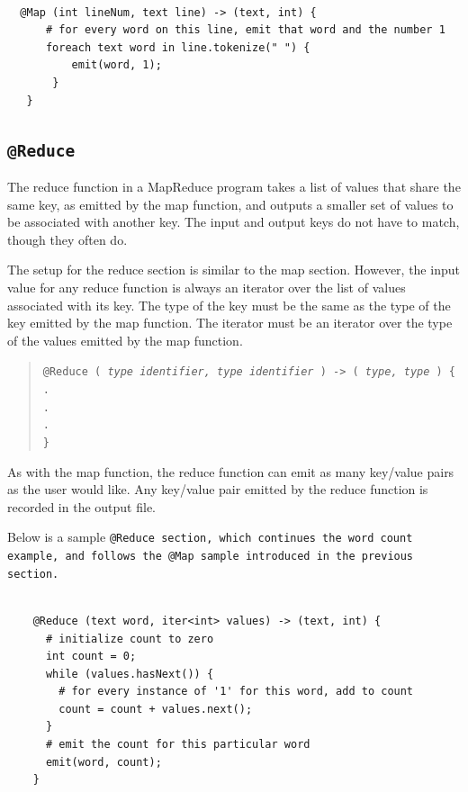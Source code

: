 \documentclass{book}
\begin{document}
\begin{verbatim}

  @Map (int lineNum, text line) -> (text, int) {
      # for every word on this line, emit that word and the number 1
      foreach text word in line.tokenize(" ") {
          emit(word, 1);
       }
   }

\end{verbatim}



\subsection{\tt @Reduce \rm} %
\label{sub:tt_reduce_rm}

The reduce function in a MapReduce program takes a list of values that share the
same key, as emitted by the map function, and outputs a smaller set of values to
be associated with another key. The input and output keys do not have to match,
though they often do.

The setup for the reduce section is similar to the map section. However, the input
value for any reduce function is always an iterator over the list of values
associated with its key. The type of the key must be the same as the type of the
key emitted by the map function. The iterator must be an iterator over the type of
the values emitted by the map function.

\begin{quotation}
  \tt @Reduce ( \rm \emph{type identifier, type identifier} \tt ) -> ( \rm \emph{type, type} \tt ) \{ \\
  \indent \indent . \\
  \indent \indent . \\
  \indent \indent . \\
  \indent \tt \} \rm
\end{quotation}

As with the map function, the reduce function can emit as many key/value pairs as
the user would like. Any key/value pair emitted by the reduce function is recorded
in the output file.

Below is a sample \tt @Reduce \rm section, which continues the word count example,
and follows the \tt @Map \rm sample introduced in the previous section.

\begin{verbatim} 

    @Reduce (text word, iter<int> values) -> (text, int) {
      # initialize count to zero
      int count = 0;
      while (values.hasNext()) {
        # for every instance of '1' for this word, add to count
        count = count + values.next();
      }
      # emit the count for this particular word
      emit(word, count);
    }

\end{verbatim} 
\end{document}
